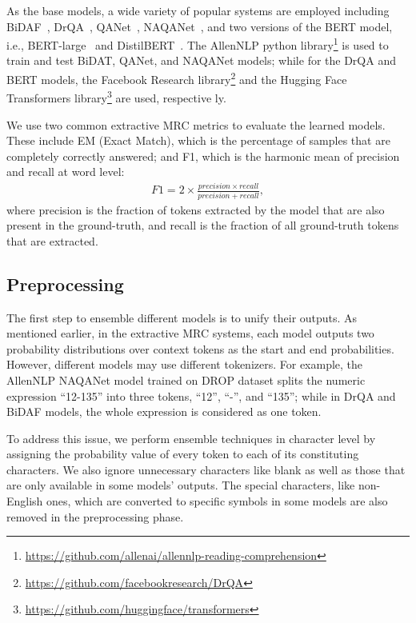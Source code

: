 \documentclass[review]{elsarticle}
\begin{document}
As the base models, a wide variety of popular systems are employed including BiDAF~\citep{RN2}, DrQA~\citep{RN57}, QANet~\citep{RN50}, NAQANet~\citep{RN206}, and two versions of the BERT model, i.e., BERT-large~\citep{devlin2018bert} and DistilBERT~\citep{RN245}. The AllenNLP python library\footnote{\url{https://github.com/allenai/allennlp-reading-comprehension}} is used to train and test BiDAT, QANet, and NAQANet models; while for the DrQA and BERT models, the Facebook Research library\footnote{\url{https://github.com/facebookresearch/DrQA}} and the Hugging Face Transformers library\footnote{\url{https://github.com/huggingface/transformers}} are used, respective ly.

We use two common extractive MRC metrics to evaluate the learned models. These include EM (Exact Match), which is the percentage of samples that are completely correctly answered; and F1, which is the harmonic mean of precision and recall at word level:
\begin{equation}\label{eq:f1}  
    \begin{aligned}
    F1= 2 \times \frac {precision\times recall}{precision + recall},
    \end{aligned}
\end{equation}
where precision is the fraction of tokens extracted by the model that are also present in the ground-truth, and recall is the fraction of all ground-truth tokens that are extracted.

\subsection{Preprocessing}
The first step to ensemble different models is to unify their outputs. As mentioned earlier, in the extractive MRC systems, each model outputs two probability distributions over context tokens as the start and end probabilities. However, different models may use different tokenizers. For example, the AllenNLP NAQANet model trained on DROP dataset splits the numeric expression ``12-135” into three tokens, ``12”, ``-”, and ``135”;
while in DrQA and BiDAF models, the whole expression is considered as one token. 

To address this issue, we perform ensemble techniques in character level by assigning the probability value of every
token to each of its constituting characters.
We also ignore unnecessary characters like blank as well as those that are only available in some models' outputs. The special
characters, like non-English ones, which are converted to specific symbols in some models are also removed in the preprocessing phase.
\end{document}
